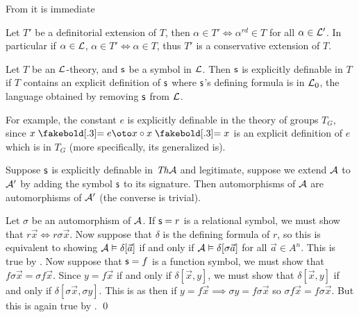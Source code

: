 \edefn

From  it is immediate

\bthrm[title=The General Elimination Theorem, name=generaleliminationtheorem]

    Let $T'$ be a definitorial extension of $T$, then $\alpha\in T'\iff\alpha^{rd}\in T$ for all $\alpha\in{\cal L}'$.
    In particular if $\alpha\in{\cal L}$, $\alpha\in T'\iff\alpha\in T$, thus $T'$ is a conservative extension of $T$.

\ethrm

\bdefn

    Let $T$ be an ${\cal L}$-theory, and ${\sf s}$ be a symbol in ${\cal L}$.
    Then ${\sf s}$ is {\emphcolor explicitly definable} in $T$ if $T$ contains an explicit definition of ${\sf s}$ where ${\sf s}$'s defining formula is in ${\cal L}_0$, the language obtained by removing
    ${\sf s}$ from ${\cal L}$.

\edefn

For example, the constant $e$ is explicitly definable in the theory of groups $T_G$, since $x\eq e\oto x\circ x\eq x$ is an explicit definition of $e$ which is in $T_G$ (more specifically, its generalized
is).

\bprop

    Suppose ${\sf s}$ is explicitly definable in ${\it Th}{\cal A}$ and legitimate, suppose we extend ${\cal A}$ to ${\cal A}'$ by adding the symbol ${\sf s}$ to its signature.
    Then automorphisms of ${\cal A}$ are automorphisms of ${\cal A}'$ (the converse is trivial).

\eprop

Let $\sigma$ be an automorphism of ${\cal A}$.
If ${\sf s}=r$ is a relational symbol, we must show that $r\vec x\iff r\sigma\vec x$.
Now suppose that $\delta$ is the defining formula of $r$, so this is equivalent to showing ${\cal A}\vDash\delta[\vec a]$ if and only if ${\cal A}\vDash\delta[\sigma\vec a]$ for all $\vec a\in A^n$.
This is true by .
Now suppose that ${\sf s}=f$ is a function symbol, we must show that $f\sigma\vec x=\sigma f\vec x$.
Since $y=f\vec x$ if and only if $\delta[\vec x,y]$, we must show that $\delta[\vec x,y]$ if and only if $\delta[\sigma\vec x,\sigma y]$.
This is as then if $y=f\vec x\implies\sigma y=f\sigma\vec x$ so $\sigma f\vec x=f\sigma\vec x$.
But this is again true by .
\qed

